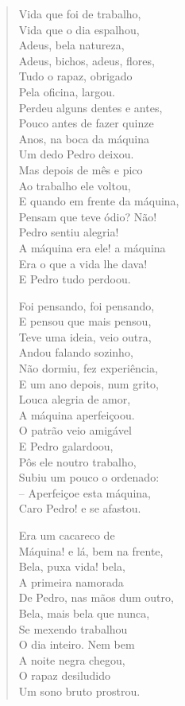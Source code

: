 \begin{verse}
Vida que foi de trabalho,\\
Vida que o dia espalhou,\\
Adeus, bela natureza,\\
Adeus, bichos, adeus, flores,\\
Tudo o rapaz, obrigado\\
Pela oficina, largou.\\
Perdeu alguns dentes e antes,\\
Pouco antes de fazer quinze\\
Anos, na boca da máquina\\
Um dedo Pedro deixou.\\
Mas depois de mês e pico\\
Ao trabalho ele voltou,\\
E quando em frente da máquina,\\
Pensam que teve ódio? Não!\\
Pedro sentiu alegria!\\
A máquina era ele! a máquina\\
Era o que a vida lhe dava!\\
E Pedro tudo perdoou.

Foi pensando, foi pensando,\\
E pensou que mais pensou,\\
Teve uma ideia, veio outra,\\
Andou falando sozinho,\\
Não dormiu, fez experiência,\\
E um ano depois, num grito,\\
Louca alegria de amor,\\
A máquina aperfeiçoou.\\
O patrão veio amigável\\
E Pedro galardoou,\\
Pôs ele noutro trabalho,\\
Subiu um pouco o ordenado:\\
-- Aperfeiçoe esta máquina,\\
Caro Pedro! e se afastou.

Era um cacareco de\\
Máquina! e lá, bem na frente,\\
Bela, puxa vida! bela,\\
A primeira namorada\\
De Pedro, nas mãos dum outro,\\
Bela, mais bela que nunca,\\
Se mexendo trabalhou\\
O dia inteiro. Nem bem\\
A noite negra chegou,\\
O rapaz desiludido\\
Um sono bruto prostrou.


\end{verse}
